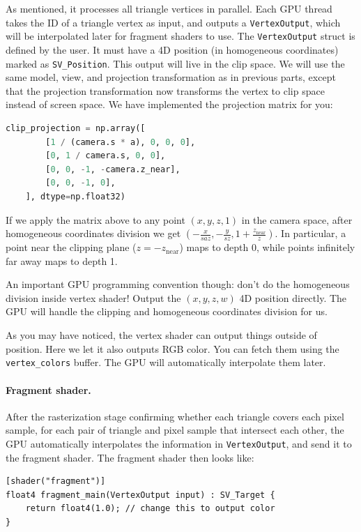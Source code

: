 As mentioned, it processes all triangle vertices in parallel. Each GPU thread takes the ID of a triangle vertex as input, and outputs a \lstinline{VertexOutput}, which will be interpolated later for fragment shaders to use. The \lstinline{VertexOutput} struct is defined by the user. It must have a 4D position (in homogeneous coordinates) marked as \lstinline{SV_Position}. This output will live in the clip space. We will use the same model, view, and projection transformation as in previous parts, except that the projection transformation now transforms the vertex to clip space instead of screen space. We have implemented the projection matrix for you:
\begin{lstlisting}[language=Python]
    clip_projection = np.array([
        [1 / (camera.s * a), 0, 0, 0],
        [0, 1 / camera.s, 0, 0],
        [0, 0, -1, -camera.z_near],
        [0, 0, -1, 0],
    ], dtype=np.float32)
\end{lstlisting}
If we apply the matrix above to any point $(x, y, z, 1)$ in the camera space, after homogeneous coordinates division we get $\left(-\frac{x}{sa z}, -\frac{y}{sz}, 1+\frac{z_{\mathrm{near}}}{z}\right)$. In particular, a point near the clipping plane ($z=-z_{\mathrm{near}}$) maps to depth 0, while points infinitely far away maps to depth 1.

An important GPU programming convention though: don't do the homogeneous division inside vertex shader! Output the $(x, y, z, w)$ 4D position directly. The GPU will handle the clipping and homogeneous coordinates division for us.

As you may have noticed, the vertex shader can output things outside of position. Here we let it also outputs RGB color. You can fetch them using the \lstinline{vertex_colors} buffer. The GPU will automatically interpolate them later.

\paragraph{Fragment shader.}
After the rasterization stage confirming whether each triangle covers each pixel sample, for each pair of triangle and pixel sample that intersect each other, the GPU automatically interpolates the information in \lstinline{VertexOutput}, and send it to the fragment shader.
The fragment shader then looks like:
\begin{lstlisting}
[shader("fragment")]
float4 fragment_main(VertexOutput input) : SV_Target {
    return float4(1.0); // change this to output color
}
\end{lstlisting}

